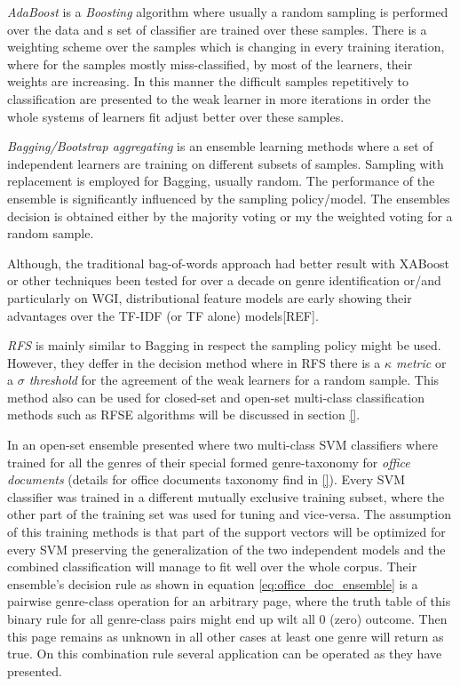 \textit{AdaBoost} is a \textit{Boosting} algorithm where usually a random sampling is performed over the data and s set of classifier are trained over these samples. There is a weighting scheme over the samples which is changing in every training iteration, where for the samples mostly miss-classified, by most of the learners, their weights are increasing. In this manner the difficult samples repetitively to classification are presented to the weak learner in more iterations in order the whole systems of learners fit adjust better over these samples.

\textit{Bagging/Bootstrap aggregating} is an ensemble learning methods where a set of independent learners are training on different subsets of samples. Sampling with replacement is employed for Bagging, usually random. The performance of the ensemble is significantly influenced by the sampling policy/model. The ensembles decision is obtained either by the majority voting or my the weighted voting for a random sample.

Although, the traditional bag-of-words approach had better result with XABoost or other techniques been tested for over a decade on genre identification or/and particularly on WGI, distributional feature models are early showing their advantages over the TF-IDF (or TF alone) models[REF].

\textit{RFS } is mainly similar to Bagging in respect the sampling policy might be used. However, they deffer in the decision method where in RFS there is a \textit{$\kappa$ metric} or a \textit{$\sigma$ threshold} for the agreement of the weak learners for a random sample. This method also can be used for closed-set and open-set multi-class classification methods such as RFSE algorithms will be discussed in section \ref{}.

In \parencite{chen2012genre} an open-set ensemble presented where two multi-class SVM classifiers where trained for all the genres of their special formed genre-taxonomy for \textit{office documents} (details for office documents taxonomy find in \ref{}). Every SVM classifier was trained in a different mutually exclusive training subset, where the other part of the training set was used for tuning and vice-versa. The assumption of this training methods is that part of the support vectors  will be optimized for every SVM preserving the generalization of the two independent models and the combined classification will manage to fit well over the whole corpus. Their ensemble's decision rule as shown in equation \ref{eq:office_doc_ensemble} is a pairwise genre-class operation for an arbitrary page, where the truth table of this binary rule for all genre-class pairs might end up wilt all $0$ (zero) outcome. Then this page remains as unknown in all other cases at least one genre will return as true. On this combination rule several application can be operated as they have presented.

